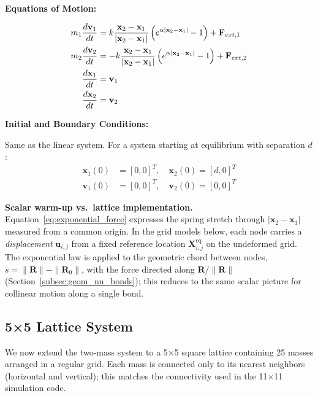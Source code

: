 \documentclass[11pt,a4paper]{article}
\begin{document}
\noindent \textbf{Equations of Motion:}

\begin{align}
m_1 \frac{d\mathbf{v}_1}{dt} &= k \frac{\mathbf{x}_2 - \mathbf{x}_1}{|\mathbf{x}_2 - \mathbf{x}_1|} \left( e^{\alpha |\mathbf{x}_2 - \mathbf{x}_1|} - 1 \right) + \mathbf{F}_{ext,1} \label{eq:exp_mass1} \\
m_2 \frac{d\mathbf{v}_2}{dt} &= -k \frac{\mathbf{x}_2 - \mathbf{x}_1}{|\mathbf{x}_2 - \mathbf{x}_1|} \left( e^{\alpha |\mathbf{x}_2 - \mathbf{x}_1|} - 1 \right) + \mathbf{F}_{ext,2} \label{eq:exp_mass2} \\
\frac{d\mathbf{x}_1}{dt} &= \mathbf{v}_1 \\
\frac{d\mathbf{x}_2}{dt} &= \mathbf{v}_2 \newline
\end{align}

\noindent \textbf{Initial and Boundary Conditions:}

\noindent Same as the linear system. For a system starting at equilibrium with separation $d$:
\begin{align}
\mathbf{x}_1(0) &= [0, 0]^T, \quad \mathbf{x}_2(0) = [d, 0]^T \\
\mathbf{v}_1(0) &= [0, 0]^T, \quad \mathbf{v}_2(0) = [0, 0]^T
\end{align}

\noindent \textbf{Scalar warm-up vs.\ lattice implementation.} Equation~\eqref{eq:exponential_force} expresses the spring stretch through $|\mathbf{x}_2-\mathbf{x}_1|$ measured from a common origin. In the grid models below, each node carries a \emph{displacement} $\mathbf{u}_{i,j}$ from a fixed reference location $\mathbf{X}_{i,j}^{\mathrm{eq}}$ on the undeformed grid. The exponential law is applied to the geometric chord between nodes, $s = \|\mathbf{R}\|-\|\mathbf{R}_0\|$, with the force directed along $\mathbf{R}/\|\mathbf{R}\|$ (Section~\ref{subsec:geom_nn_bonds}); this reduces to the same scalar picture for collinear motion along a single bond.

\subsection{5×5 Lattice System}

\noindent We now extend the two-mass system to a 5×5 square lattice containing 25 masses arranged in a regular grid. Each mass is connected only to its nearest neighbors (horizontal and vertical); this matches the connectivity used in the 11×11 simulation code.
\end{document}
